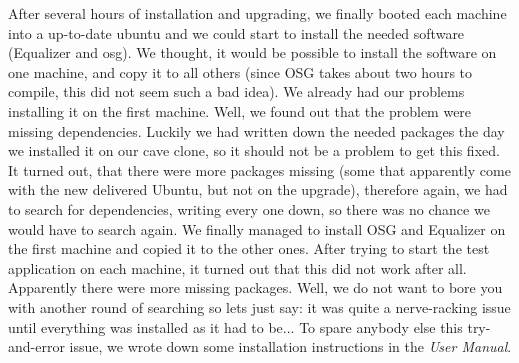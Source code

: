 After several hours of installation and upgrading, we finally booted each machine into a up-to-date ubuntu and we could start to install the needed software (Equalizer and \gls{osg}). We thought, it would be possible to install the software on one machine, and copy it to all others (since OSG takes about two hours to compile, this did not seem such a bad idea). We already had our problems installing it on the first machine. Well, we found out that the problem were missing dependencies. Luckily we had written down the needed packages the day we installed it on our \gls{cave} clone, so it should not be a problem to get this fixed. It turned out, that there were more packages missing (some that apparently come with the new delivered Ubuntu, but not on the upgrade), therefore again, we had to search for dependencies, writing every one down, so there was no chance we would have to search again. We finally managed to install OSG and Equalizer on the first machine and copied it to the other ones. 
After trying to start the test application on each machine, it turned out that this did not work after all. Apparently there were more missing packages. Well, we do not want to bore you with another round of searching so lets just say: it was quite a nerve-racking issue until everything was installed as it had to be...
To spare anybody else this try-and-error issue, we wrote down some installation instructions in the \emph{User Manual}.
